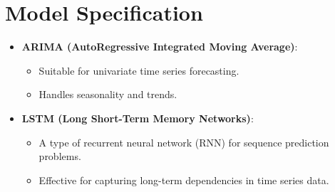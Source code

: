 \section{Model Specification}
\begin{itemize}
	\item \textbf{ARIMA (AutoRegressive Integrated Moving Average)}: 
	\begin{itemize}
		\item Suitable for univariate time series forecasting.
		\item Handles seasonality and trends.
	\end{itemize}
	
	\item \textbf{LSTM (Long Short-Term Memory Networks)}:
	\begin{itemize}
		\item A type of recurrent neural network (RNN) for sequence prediction problems.
		\item Effective for capturing long-term dependencies in time series data.
	\end{itemize}
\end{itemize}
\clearpage

